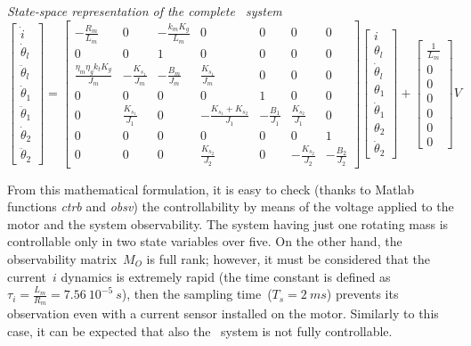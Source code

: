 \noindent \textit{State-space representation of the complete \twodof\ system}
\begin{equation}
	\begin{bmatrix}
		\dot{i} \\
		\dot{\theta}_l \\
		\ddot{\theta}_l \\
		\dot{\theta}_1 \\
		\ddot{\theta}_1 \\
		\dot{\theta}_2 \\
		\ddot{\theta}_2
	\end{bmatrix}
	=
	\begin{bmatrix}
		-\frac{R_m}{L_m} & 0 & -\frac{k_m K_g}{L_m} & 0 & 0 & 0 & 0 \\
		0 & 0 &1 & 0 & 0 & 0 & 0 \\
		\frac{\eta_m \eta_g k_t K_g}{J_m} & -\frac{K_{s_1}}{J_m} & -\frac{B_m}{J_m} & \frac{K_{s_1}}{J_m} & 0 & 0 & 0 \\
		0 & 0 & 0 & 0 & 1 & 0 & 0 \\
		0 & \frac{K_{s_1}}{J_1} & 0 & -\frac{K_{s_1}+K_{s_2}}{J_1} & -\frac{B_1}{J_1} & \frac{K_{s_2}}{J_1} & 0 \\
		0 & 0 & 0 & 0 & 0 & 0 & 1 \\
		0 & 0 & 0 & \frac{K_{s_2}}{J_2} & 0 & -\frac{K_{s_2}}{J_2} & -\frac{B_2}{J_2}
	\end{bmatrix}
	\begin{bmatrix}
		i \\
		\theta_l \\
		\dot{\theta}_l \\
		\theta_1 \\
		\dot{\theta}_1 \\
		\theta_2 \\
		\dot{\theta}_2
	\end{bmatrix}
	+
	\begin{bmatrix}
		\frac{1}{L_m} \\
		0 \\
		0 \\
		0 \\
		0 \\
		0 \\
		0
	\end{bmatrix}
	V
\end{equation}

From this mathematical formulation, it is easy to check (thanks to Matlab functions  \textit{ctrb} and \textit{obsv}) the controllability by means of the voltage applied to the motor and the system observability.
The system having just one rotating mass is controllable only in two state variables over five. On the other hand, the observability matrix~$M_O$ is full rank; however, it must be considered that the current~$i$ dynamics is extremely rapid (the time constant is defined as~$\tau_i = \frac{L_m}{R_m} = 7.56\ 10^{-5} \ s$), then the sampling time~($T_s = 2\ ms$) prevents its observation even with a current sensor installed on the motor.
Similarly to this case, it can be expected that also the \twodof~system is not fully controllable. \\


